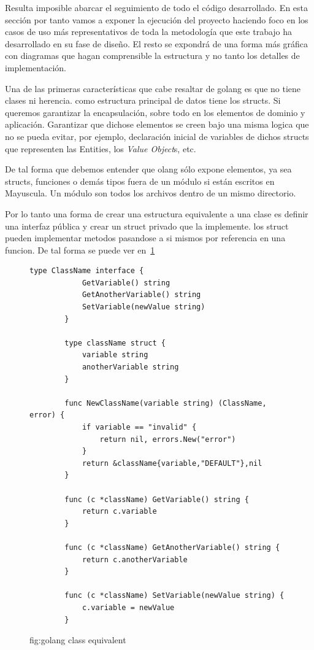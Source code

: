 Resulta imposible abarcar el seguimiento de todo el código desarrollado. En esta sección por tanto vamos a exponer la ejecución del proyecto haciendo foco en los casos de uso más representativos de toda la metodología que este trabajo ha desarrollado en su fase de diseño. El resto se expondrá de una forma más gráfica con diagramas que hagan comprensible la estructura y no tanto los detalles de implementación.

Una de las primeras características que cabe resaltar de golang es que no tiene clases ni herencia. como estructura
principal de datos tiene los structs. Si queremos garantizar la encapsulación, sobre todo en los elementos de dominio y aplicación. Garantizar que dichose elementos se creen bajo una misma logica que no se pueda evitar, por ejemplo, declaración inicial de variables de dichos structs que representen las Entities, los \textit{Value Object}s, etc.

De tal forma que debemos entender que olang sólo expone elementos, ya sea structs, funciones o demás tipos fuera de un módulo si están escritos en Mayuscula. Un módulo son todos los archivos dentro de un mismo directorio.

Por lo tanto una forma de crear una estructura equivalente a una clase es definir una interfaz pública y crear un struct privado que la implemente. los struct pueden implementar metodos pasandose a si mismos por referencia en una funcion. De tal forma se puede ver en~\cref{fig:golang class equivalent}

\begin{figure}[H]
    \centering
    \begin{lstlisting}[label={lst:lstlisting}]
        type ClassName interface {
            GetVariable() string
            GetAnotherVariable() string
            SetVariable(newValue string)
        }

        type className struct {
            variable string
            anotherVariable string
        }

        func NewClassName(variable string) (ClassName, error) {
            if variable == "invalid" {
                return nil, errors.New("error")
            }
            return &className{variable,"DEFAULT"},nil
        }

        func (c *className) GetVariable() string {
            return c.variable
        }

        func (c *className) GetAnotherVariable() string {
            return c.anotherVariable
        }

        func (c *className) SetVariable(newValue string) {
            c.variable = newValue
        }
    \end{lstlisting}
    \caption{fig:golang class equivalent}\label{fig:golang class equivalent}
\end{figure}

